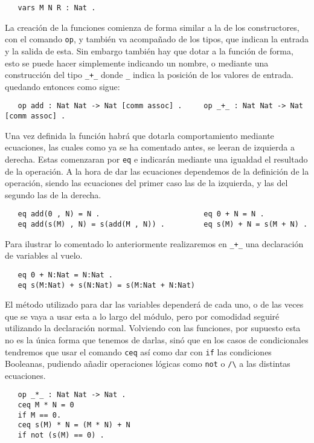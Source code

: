 {\codesize
\begin{verbatim}
   vars M N R : Nat .
\end{verbatim}
}

La creación de la funciones comienza de forma similar a la de los constructores, con el comando \texttt{op}, y también va acompañado de los tipos, que indican la entrada y la salida de esta. Sin embargo también hay que dotar a la función de forma, esto se puede hacer simplemente indicando un nombre, o mediante una construcción del tipo \verb"_+_" donde \verb"_" indica la posición de los valores de entrada. quedando entonces como sigue: \par

{\codesize
\begin{verbatim}
   op add : Nat Nat -> Nat [comm assoc] .     op _+_ : Nat Nat -> Nat [comm assoc] .
\end{verbatim}
}

Una vez definida la función habrá que dotarla comportamiento mediante ecuaciones, las cuales como ya se ha comentado antes, se leeran de izquierda a derecha. Estas comenzaran por \texttt{eq} e indicarán mediante una igualdad el resultado de la operación. A la hora de dar las ecuaciones dependemos de la definición de la operación, siendo las ecuaciones del primer caso las de la izquierda, y las del segundo las de la derecha. \par
{\codesize
\begin{verbatim}
   eq add(0 , N) = N .                        eq 0 + N = N .
   eq add(s(M) , N) = s(add(M , N)) .         eq s(M) + N = s(M + N) .
\end{verbatim}
}

Para ilustrar lo comentado lo anteriormente realizaremos en \verb"_+_" una declaración de variables al vuelo. \par
{\codesize
\begin{verbatim}
   eq 0 + N:Nat = N:Nat .
   eq s(M:Nat) + s(N:Nat) = s(M:Nat + N:Nat) 
\end{verbatim}
}
 
El método utilizado para dar las variables dependerá de cada uno, o de las veces que se vaya a usar esta a lo largo del módulo, pero por comodidad seguiré utilizando la declaración normal. Volviendo con las funciones, por supuesto esta no es la única forma que tenemos de darlas, sinó que en los casos de condicionales tendremos que usar el comando \texttt{ceq} así como dar con \texttt{if} las condiciones Booleanas, pudiendo añadir operaciones lógicas como \texttt{not} o \verb"/\" a las distintas ecuaciones.\par
{\codesize
\begin{verbatim}
   op _*_ : Nat Nat -> Nat .
   ceq M * N = 0 
   if M == 0.
   ceq s(M) * N = (M * N) + N
   if not (s(M) == 0) .
\end{verbatim}
}

